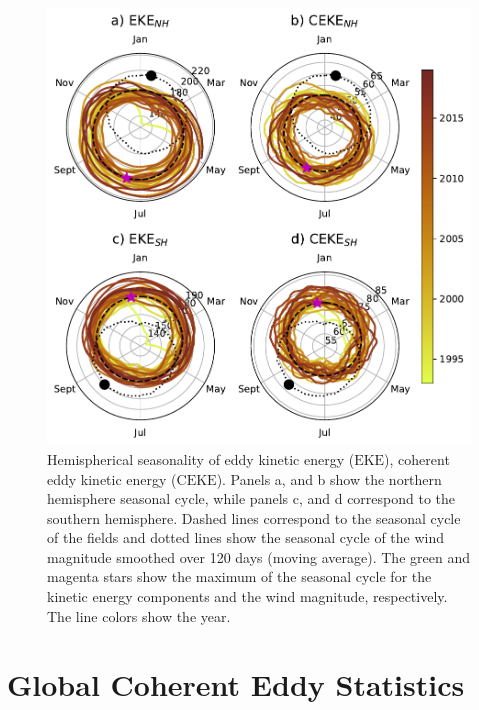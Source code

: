 \documentclass[draft,linenumbers]{agujournal2019}
\newcommand{\EKE}{\textrm{EKE}}
\newcommand{\CEKE}{\textrm{CEKE}}
\begin{document}
	\begin{figure}
	    \centering
	    \includegraphics[width=1\textwidth]{figures/All_polar_plots.pdf}
	    \caption{Hemispherical seasonality of eddy kinetic energy ($\EKE$), coherent eddy kinetic energy ($\CEKE$). Panels a, and b show the northern hemisphere seasonal cycle, while panels c, and d correspond to the southern hemisphere. Dashed lines correspond to the seasonal cycle of the fields and dotted lines show the seasonal cycle of the wind magnitude smoothed over 120 days (moving average). The green and magenta stars show the maximum of the seasonal cycle for the kinetic energy components and the wind magnitude, respectively. The line colors show the year.}
	    \label{fig:eddy_energy_polar}
	\end{figure}
	
	\section{Global Coherent Eddy Statistics}
	\label{subsec:CE_stats}
\end{document}

